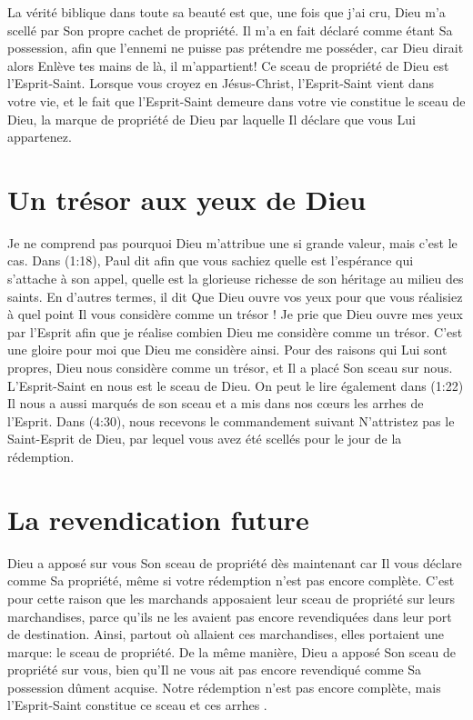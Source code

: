 La vérité biblique dans toute sa beauté est que, une fois que j'ai cru,
 Dieu m'a scellé par Son propre cachet de propriété.
 Il m'a en fait déclaré comme étant Sa possession, afin que l'ennemi
 ne puisse pas prétendre me posséder, car Dieu dirait alors\frcolon{}
 \Og  Enlève tes mains de là, il m'appartient! \Fg{}
 Ce sceau de propriété de Dieu est l'Esprit-Saint.
 Lorsque vous croyez en Jésus-Christ, l'Esprit-Saint vient dans votre vie,
 et le fait que l'Esprit-Saint demeure dans votre vie
 constitue le sceau de Dieu, la marque de propriété de Dieu
 par laquelle Il déclare que vous Lui appartenez.


\section{Un tr\'esor aux yeux de Dieu}

Je ne comprend pas pourquoi Dieu m'attribue une si grande valeur,
 mais c'est le cas.
 Dans (1:18), Paul dit\frcolon{}
 \Og [\dots{}] afin que vous sachiez quelle est l'espérance
 qui s'attache à son appel, quelle est la glorieuse richesse
 de son héritage au milieu des saints. \Fg{}
 En d'autres termes, il dit\frcolon{}
 \Og Que Dieu ouvre vos yeux pour que vous réalisiez
 à quel point Il vous considère comme un trésor ! \Fg{}
 Je prie que Dieu ouvre mes yeux par l'Esprit afin que je réalise
 combien Dieu me considère comme un trésor. C'est une gloire pour moi que Dieu me considère ainsi.
 Pour des raisons qui Lui sont propres, Dieu nous considère comme un trésor,
 et Il a placé Son sceau sur nous.
 L'Esprit-Saint en nous est le sceau de Dieu.
 On peut le lire également dans (1:22)\frcolon{}
 \Og Il nous a aussi marqués de son sceau et a mis dans nos cœurs
 les arrhes de l'Esprit. \Fg{}
 Dans (4:30), nous recevons le commandement suivant\frcolon{}
 \Og N'attristez pas le Saint-Esprit de Dieu, par lequel
 vous avez été scellés pour le jour de la rédemption. \Fg{}


\section{La revendication future}

Dieu a apposé sur vous Son sceau de propriété dès maintenant
 car Il vous déclare comme Sa propriété, même si votre rédemption
 n'est pas encore complète.
 C'est pour cette raison que les marchands apposaient leur sceau de propriété
 sur leurs marchandises, parce qu'ils ne les avaient pas encore revendiquées
 dans leur port de destination. Ainsi, partout où allaient ces marchandises,
 elles portaient une marque: le sceau de propriété.
 De la même manière, Dieu a apposé Son sceau de propriété sur vous,
 bien qu'Il ne vous ait pas encore revendiqué comme Sa possession dûment acquise.
 Notre rédemption n'est pas encore complète,
 mais l'Esprit-Saint constitue ce sceau et \Og ces arrhes \Fg{}.

